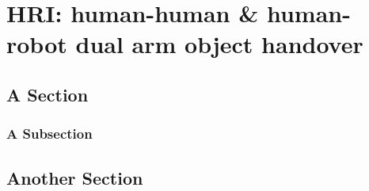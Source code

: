 \chapter{HRI: human-human \& human-robot dual arm object handover\newline}


\section{A Section}


\subsection{A Subsection}


\section{Another Section}
